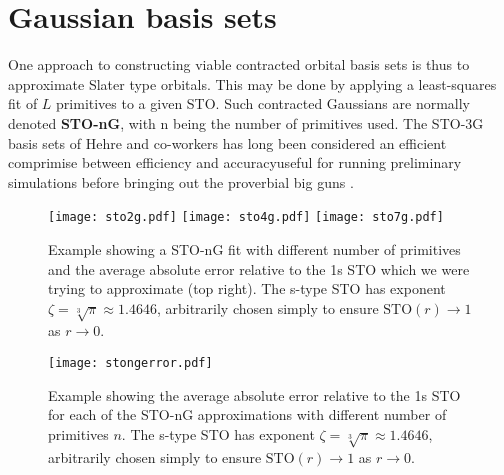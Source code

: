 \documentclass[../../master.tex]{subfiles}
\begin{document}
\section{Gaussian basis sets}
One approach to constructing viable contracted orbital basis sets is thus to approximate Slater type orbitals. This may be done by applying a least-squares fit of $L$ primitives to a given STO. Such contracted Gaussians are normally denoted {\bf STO-nG}, with n being the number of primitives used. The STO-3G basis sets of Hehre and co-workers has long been considered an efficient comprimise between efficiency and accuracy\textemdash useful for running preliminary simulations before bringing out the proverbial big guns \cite{hehre,cramer,taylor}.


\begin{figure}
\centering
\texttt{[image: sto2g.pdf]}
\texttt{[image: sto4g.pdf]}
\texttt{[image: sto7g.pdf]}
\caption{Example showing a STO-nG fit with different number of primitives and the average absolute error relative to the 1s STO which we were trying to approximate (top right). The s-type STO has exponent $\zeta=\sqrt[3]{\pi}\approx1.4646$, arbitrarily chosen simply to ensure $\text{STO}(r)\rightarrow1$ as $r\rightarrow0$. \label{fig:sto24g}}
\end{figure}


\begin{SCfigure}
\centering
\texttt{[image: stongerror.pdf]}
\caption{Example showing the average absolute error relative to the 1s STO  for each of the STO-nG approximations with different number of primitives $n$. The s-type STO has exponent $\zeta=\sqrt[3]{\pi}\approx1.4646$, arbitrarily chosen simply to ensure $\text{STO}(r)\rightarrow1$ as $r\rightarrow0$. \label{fig:stoerror}}
\end{SCfigure}
\end{document}
